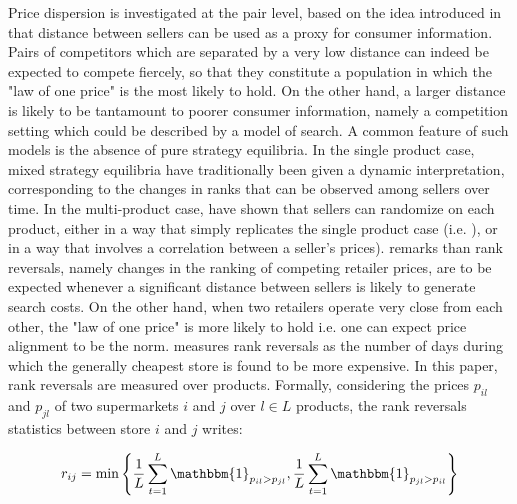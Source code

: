 \documentclass[english]{article}
\begin{document}
Price dispersion is investigated at the pair level, based on the idea introduced in \cite{TAP11} that distance between sellers can be used as a proxy for consumer information. Pairs of competitors which are separated by a very low distance can indeed be expected to compete fiercely, so that they constitute a population in which the "law of one price" is the most likely to hold. On the other hand, a larger distance is likely to be tantamount to poorer consumer information, namely a competition setting which could be described by a model of search. A common feature of such models is the absence of pure strategy equilibria. In the single product case, mixed strategy equilibria have traditionally been given a dynamic interpretation, corresponding to the changes in ranks that can be observed among sellers over time. In the multi-product case, \cite{MCA95} have shown that sellers can randomize on each product, either in a way that simply replicates the single product case (i.e. \cite{VAR80}), or in a way that involves a correlation between a seller's prices). \cite{TAP11} remarks than rank reversals, namely changes in the ranking of competing retailer prices, are to be expected whenever a significant distance between sellers is likely to generate search costs. On the other hand, when two retailers operate very close from each other, the "law of one price" is more likely to hold i.e. one can expect price alignment to be the norm. \cite{TAP11} measures rank reversals as the number of days during which the generally cheapest store is found to be more expensive. In this paper, rank reversals are measured over products. Formally, considering the prices $p_{il}$ and $p_{jl}$ of two supermarkets $i$ and $j$ over $l \in L$ products, the rank reversals statistics between store $i$ and $j$ writes:

\begin{align}
r_{ij} = \min\left\{\frac{1}{L} \sum_{t=1}^{L} \mathbbm{1}_{p_{il} > p_{jl}}, \frac{1}{L} \sum_{t=1}^{L} \mathbbm{1}_{p_{jl} > p_{il}}\right\}
\label{formula_rr_static}
\end{align}

\end{document}
